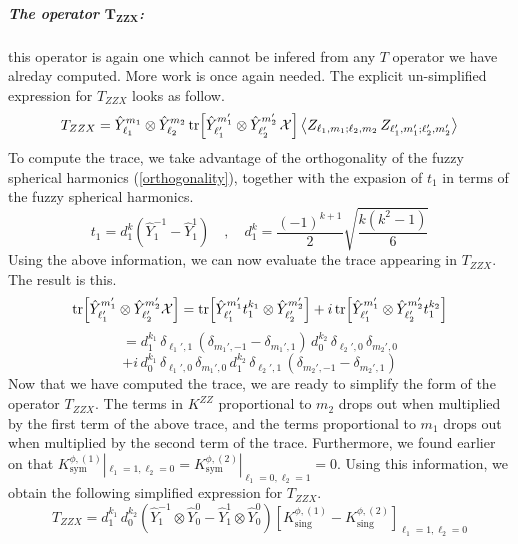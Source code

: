 \subparagraph[The operator $T_{ZZX}$]{The operator $\mathbf{T_{ZZX}}$:} this operator is again one which cannot be infered from any $T$ operator we have alreday computed. More work is once again needed. The explicit un-simplified expression for $T_{ZZX}$ looks as follow.
%
%
\begin{equation}
T_{ZZX} = \hat{Y}_{\ell_1}^{m_1} \otimes \hat{Y}_{\ell_2}^{m_2}
\tr[\hat{Y}_{\ell_1'}^{m_1'} \otimes \hat{Y}_{\ell_2'}^{m_2'} \, \mathcal{X}]
\expval{Z_{\ell_1, m_1; \ell_2, m_2} \, Z_{\ell_1', m_1'; \ell_2', m_2'}}
\end{equation}
%
%
To compute the trace, we take advantage of the orthogonality of the fuzzy spherical harmonics (\ref{orthogonality}), together with the expasion of $t_1$ in terms of the fuzzy spherical harmonics.
%
%
\begin{equation}
t_1 = d_1^k \left( \hat{Y}^{-1}_{1} - \hat{Y}^{1}_{1} \right)
%
\quad , \quad
%
d_1^k = \frac{(-1)^{k+1}}{2} \sqrt{\frac{k(k^2-1)}{6}}
\end{equation}
%
%
Using the above information, we can now evaluate the trace appearing in $T_{ZZX}$. The result is this.
%
%
\begin{equation*}
\tr[\hat{Y}_{\ell_1'}^{m_1'} \otimes \hat{Y}_{\ell_2'}^{m_2'} \mathcal{X}]
=
\tr[\hat{Y}_{\ell_1'}^{m_1'} t_1^{k_1} \otimes \hat{Y}_{\ell_2'}^{m_2'} ]
+
i \tr[\hat{Y}_{\ell_1'}^{m_1'} \otimes \hat{Y}_{\ell_2'}^{m_2'} t_1^{k_2} ]
\end{equation*}
%
%
\begin{equation*}
=
d_1^{k_1} \, \delta_{\ell_1',1} \, (\delta_{m_1',-1} - \delta_{m_1',1}) \,
d_0^{k_2} \, \delta_{\ell_2',0} \, \delta_{m_2',0}
\end{equation*}
%
%
\begin{equation}
+
i \, d_0^{k_1} \, \delta_{\ell_1',0} \, \delta_{m_1',0}
\, d_1^{k_2} \, \delta_{\ell_2',1} \, (\delta_{m_2',-1} - \delta_{m_2',1})
\end{equation}
%
%
Now that we have computed the trace, we are ready to simplify the form of the operator $T_{ZZX}$. The terms in $K^{ZZ}$ proportional to $m_2$ drops out when multiplied by the first term of the above trace, and the terms proportional to $m_1$ drops out when multiplied by the second term of the trace. Furthermore, we found earlier on that $K^{\phi,(1)}_{\text{sym}} |_{\ell_1=1,\ell_2=0} = K^{\phi,(2)}_{\text{sym}} |_{\ell_1=0,\ell_2=1} = 0$. Using this information, we obtain the following simplified expression for $T_{ZZX}$.
%
%
\begin{equation*}
T_{ZZX}
=
d_1^{k_1} \, d_0^{k_2} \left(
\hat{Y}^{-1}_{1} \otimes \hat{Y}^{0}_{0}
-
\hat{Y}^{1}_{1} \otimes \hat{Y}^{0}_{0}
\right)
\left[
K^{\phi,(1)}_{\mathrm{sing}} - K^{\phi,(2)}_{\mathrm{sing}}
\right]_{\ell_1=1,\ell_2=0}
\end{equation*}
